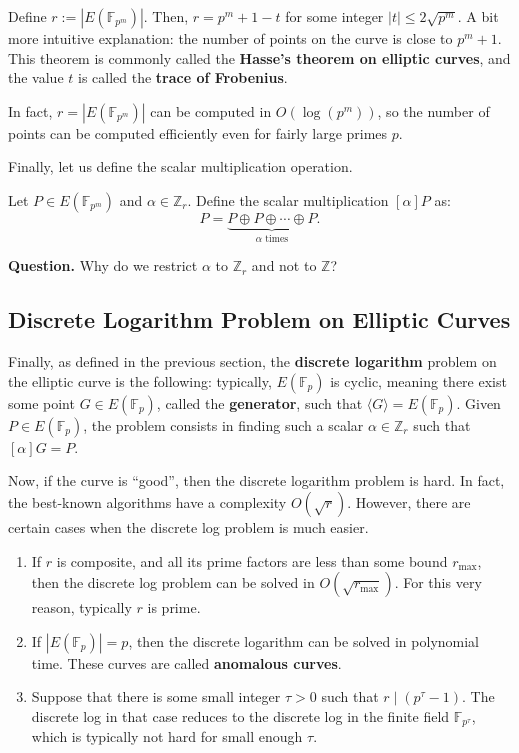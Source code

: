 \documentclass[../lecture-notes.tex]{subfiles}
\begin{document}
\begin{theorem}
    Define $r := |E(\mathbb{F}_{p^m})|$. Then, $r = p^m + 1 - t$ for some integer $|t| \leq 2\sqrt{p^m}$. A bit more intuitive explanation: the number of points on the curve is close to $p^m+1$. This theorem is commonly called the \textbf{Hasse's theorem on elliptic curves}, and the value $t$ is called the \textbf{trace of Frobenius}.
\end{theorem}

\begin{remark}
    In fact, $r=|E(\mathbb{F}_{p^m})|$ can be computed in $O(\log(p^m))$, so the number of points can be computed efficiently even for fairly large primes $p$.
\end{remark}

Finally, let us define the scalar multiplication operation. 

\begin{definition}
    Let $P \in E(\mathbb{F}_{p^m})$ and $\alpha \in \mathbb{Z}_r$. Define the scalar multiplication $[\alpha]P$ as:
    \begin{equation}
        [\alpha]P = \underbrace{P \oplus P \oplus \cdots \oplus P}_{\alpha \text{ times}}.
    \end{equation}
\end{definition}

\textbf{Question.} Why do we restrict $\alpha$ to $\mathbb{Z}_r$ and not to $\mathbb{Z}$?

\subsection{Discrete Logarithm Problem on Elliptic Curves}
Finally, as defined in the previous section, the \textbf{discrete logarithm} problem on the elliptic curve is the following: typically, $E(\mathbb{F}_p)$ is cyclic, meaning there exist some point $G \in E(\mathbb{F}_p)$, called the \textbf{generator}, such that $\langle G \rangle = E(\mathbb{F}_p)$. Given $P \in E(\mathbb{F}_p)$, the problem consists in finding such a scalar $\alpha \in \mathbb{Z}_r$ such that $[\alpha]G = P$. 

Now, if the curve is ``good'', then the discrete logarithm problem is hard. In fact, the best-known algorithms have a complexity $O(\sqrt{r})$. However, there are certain cases when the discrete log problem is much easier.
\begin{enumerate}
    \item If $r$ is composite, and all its prime factors are less than some bound $r_{\max}$, then the discrete log problem can be solved in $O(\sqrt{r_{\max}})$. For this very reason, typically $r$ is prime.
    \item If $|E(\mathbb{F}_p)|=p$, then the discrete logarithm can be solved in polynomial time. These curves are called \textbf{anomalous curves}.
    \item Suppose that there is some small integer $\tau>0$ such that $r \mid (p^{\tau}-1)$. The discrete log in that case reduces to the discrete log in the finite field $\mathbb{F}_{p^{\tau}}$, which is typically not hard for small enough $\tau$.
\end{enumerate}
\end{document}
